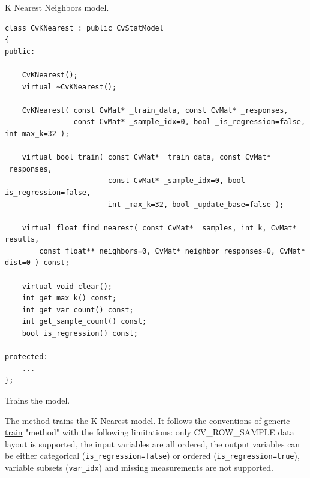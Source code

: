
K Nearest Neighbors model.

\begin{lstlisting}
class CvKNearest : public CvStatModel
{
public:

    CvKNearest();
    virtual ~CvKNearest();

    CvKNearest( const CvMat* _train_data, const CvMat* _responses,
                const CvMat* _sample_idx=0, bool _is_regression=false, int max_k=32 );

    virtual bool train( const CvMat* _train_data, const CvMat* _responses,
                        const CvMat* _sample_idx=0, bool is_regression=false,
                        int _max_k=32, bool _update_base=false );

    virtual float find_nearest( const CvMat* _samples, int k, CvMat* results,
        const float** neighbors=0, CvMat* neighbor_responses=0, CvMat* dist=0 ) const;

    virtual void clear();
    int get_max_k() const;
    int get_var_count() const;
    int get_sample_count() const;
    bool is_regression() const;

protected:
    ...
};
\end{lstlisting}




Trains the model.


The method trains the K-Nearest model. It follows the conventions of generic \href{#CvStatModel_train}{train} "method" with the following limitations: only CV\_ROW\_SAMPLE data layout is supported, the input variables are all ordered, the output variables can be either categorical (\texttt{is\_regression=false}) or ordered (\texttt{is\_regression=true}), variable subsets (\texttt{var\_idx}) and missing measurements are not supported.

